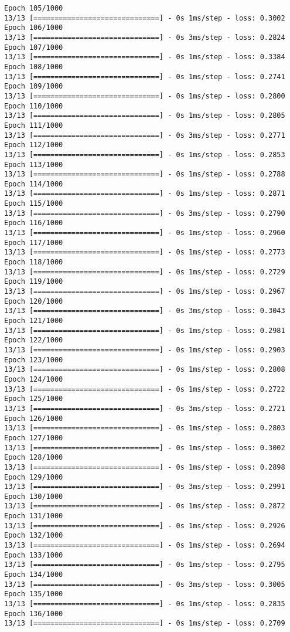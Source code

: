\documentclass[11pt]{article}
\begin{document}
\begin{Verbatim}[commandchars=\\\{\}]
Epoch 105/1000
13/13 [==============================] - 0s 1ms/step - loss: 0.3002
Epoch 106/1000
13/13 [==============================] - 0s 3ms/step - loss: 0.2824
Epoch 107/1000
13/13 [==============================] - 0s 1ms/step - loss: 0.3384
Epoch 108/1000
13/13 [==============================] - 0s 1ms/step - loss: 0.2741
Epoch 109/1000
13/13 [==============================] - 0s 1ms/step - loss: 0.2800
Epoch 110/1000
13/13 [==============================] - 0s 1ms/step - loss: 0.2805
Epoch 111/1000
13/13 [==============================] - 0s 3ms/step - loss: 0.2771
Epoch 112/1000
13/13 [==============================] - 0s 1ms/step - loss: 0.2853
Epoch 113/1000
13/13 [==============================] - 0s 1ms/step - loss: 0.2788
Epoch 114/1000
13/13 [==============================] - 0s 1ms/step - loss: 0.2871
Epoch 115/1000
13/13 [==============================] - 0s 3ms/step - loss: 0.2790
Epoch 116/1000
13/13 [==============================] - 0s 1ms/step - loss: 0.2960
Epoch 117/1000
13/13 [==============================] - 0s 1ms/step - loss: 0.2773
Epoch 118/1000
13/13 [==============================] - 0s 1ms/step - loss: 0.2729
Epoch 119/1000
13/13 [==============================] - 0s 1ms/step - loss: 0.2967
Epoch 120/1000
13/13 [==============================] - 0s 3ms/step - loss: 0.3043
Epoch 121/1000
13/13 [==============================] - 0s 1ms/step - loss: 0.2981
Epoch 122/1000
13/13 [==============================] - 0s 1ms/step - loss: 0.2903
Epoch 123/1000
13/13 [==============================] - 0s 1ms/step - loss: 0.2808
Epoch 124/1000
13/13 [==============================] - 0s 1ms/step - loss: 0.2722
Epoch 125/1000
13/13 [==============================] - 0s 3ms/step - loss: 0.2721
Epoch 126/1000
13/13 [==============================] - 0s 1ms/step - loss: 0.2803
Epoch 127/1000
13/13 [==============================] - 0s 1ms/step - loss: 0.3002
Epoch 128/1000
13/13 [==============================] - 0s 1ms/step - loss: 0.2898
Epoch 129/1000
13/13 [==============================] - 0s 3ms/step - loss: 0.2991
Epoch 130/1000
13/13 [==============================] - 0s 1ms/step - loss: 0.2872
Epoch 131/1000
13/13 [==============================] - 0s 1ms/step - loss: 0.2926
Epoch 132/1000
13/13 [==============================] - 0s 1ms/step - loss: 0.2694
Epoch 133/1000
13/13 [==============================] - 0s 1ms/step - loss: 0.2795
Epoch 134/1000
13/13 [==============================] - 0s 3ms/step - loss: 0.3005
Epoch 135/1000
13/13 [==============================] - 0s 1ms/step - loss: 0.2835
Epoch 136/1000
13/13 [==============================] - 0s 1ms/step - loss: 0.2709

\end{Verbatim}
\end{document}
